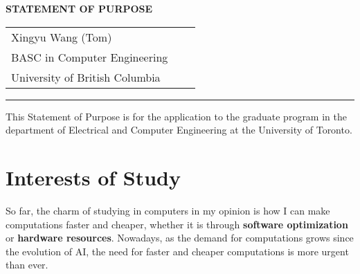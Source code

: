 \documentclass[a4 paper, 10pt]{article}
\begin{document}
\newcommand{\ifstringequal}[4]{%
	\ifnum\pdfstrcmp{#1}{#2}=0
	#3%
	\else
	#4%
	\fi
}


\newcommand{\theSchoolFullName}{the University of Toronto}
\newcommand{\theFacultyMember}{Prof. Mark Jeffrey, Prof. Natalie Jerger and Prof. Vaughn Betz}
\newcommand{\theDepartment}{the department of Electrical and Computer Engineering}

\pagestyle{empty} %

{\selectfont %

	\begin{center}
		\begin{minipage}{.9\textwidth}
			\Large{\textbf{STATEMENT OF PURPOSE}}
		\end{minipage}

		\begin{tabularx}{.8\textwidth}{X r X}
			Xingyu Wang (Tom)                                                               \\
			BASC in Computer Engineering            \\
			University of British Columbia 
		\end{tabularx}
		\par\noindent\rule{\textwidth}{1.25pt}
	\end{center}

}

\selectfont %

This Statement of Purpose is for the application to the graduate program in \theDepartment{} at \theSchoolFullName{}.

\section*{Interests of Study}
So far, the charm of studying in computers in my opinion is how I can make computations {faster and cheaper}, whether it is through \textbf{software optimization} or \textbf{hardware resources}. Nowadays, as the demand for computations grows since the evolution of {AI}, the need for {faster and cheaper computations} is more urgent than ever.
\end{document}
